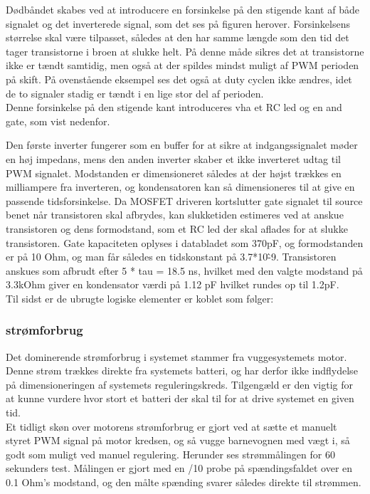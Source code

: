 
Dødbåndet skabes ved at introducere en forsinkelse på den stigende kant af både signalet og det inverterede signal, som det ses på figuren herover. Forsinkelsens størrelse skal være tilpasset, således at den har samme længde som den tid det tager transistorne i broen at slukke helt. På denne måde sikres det at transistorne ikke er tændt samtidig, men også at der spildes mindst muligt af PWM perioden på skift.
På ovenstående eksempel ses det også at duty cyclen ikke ændres, idet de to signaler stadig er tændt i en lige stor del af perioden.\\
Denne forsinkelse på den stigende kant introduceres vha et RC led og en and gate, som vist nedenfor.


Den første inverter fungerer som en buffer for at sikre at indgangssignalet møder en høj impedans, mens den anden inverter skaber et ikke inverteret udtag til PWM signalet. Modstanden er dimensioneret således at der højst trækkes en milliampere fra inverteren, og kondensatoren kan så dimensioneres til at give en passende tidsforsinkelse. Da MOSFET driveren kortslutter gate signalet til source benet når transistoren skal afbrydes, kan slukketiden estimeres ved at anskue transistoren og dens formodstand, som et RC led der skal aflades for at slukke transistoren. Gate kapaciteten oplyses i databladet som 370pF, og formodstanden er på 10 Ohm, og man får således en tidskonstant på 3.7*10\^-9. Transistoren anskues som afbrudt efter 5 * tau = 18.5 ns, hvilket med den valgte modstand på 3.3kOhm giver en kondensator værdi på 1.12 pF hvilket rundes op til 1.2pF. \\
Til sidst er de ubrugte logiske elementer er koblet som følger:


\subsubsection{strømforbrug}
Det dominerende strømforbrug i systemet stammer fra vuggesystemets motor. Denne strøm trækkes direkte fra systemets batteri, og har derfor ikke indflydelse på dimensioneringen af systemets reguleringskreds. Tilgengæld er den vigtig for at kunne vurdere hvor stort et batteri der skal til for at drive systemet en given tid.\\ 
Et tidligt skøn over motorens strømforbrug er gjort ved at sætte et manuelt styret PWM signal på motor kredsen, og så vugge barnevognen med vægt i, så godt som muligt ved manuel regulering. Herunder ses strømmålingen for 60 sekunders test. Målingen er gjort med en /10 probe på spændingsfaldet over en 0.1 Ohm's modstand, og den målte spænding svarer således direkte til strømmen.\\

